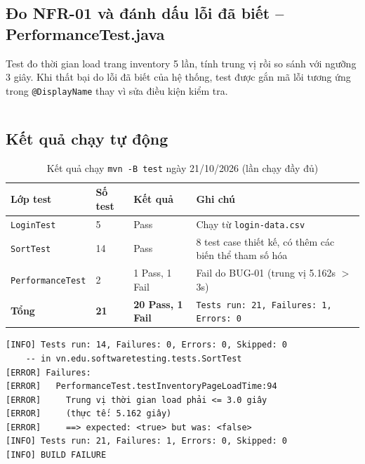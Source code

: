 \documentclass[12pt,a4paper]{article}
\newcommand{\tablestyle}{\small\renewcommand{\arraystretch}{1.25}}
\newcommand{\hrow}{\rowcolor{tablehead}}
\begin{document}
\subsection{Đo NFR-01 và đánh dấu lỗi đã biết -- PerformanceTest.java}
Test đo thời gian load trang inventory 5 lần, tính trung vị rồi so sánh với ngưỡng 3 giây.
Khi thất bại do lỗi đã biết của hệ thống, test được gắn mã lỗi tương ứng trong
\texttt{@DisplayName} thay vì sửa điều kiện kiểm tra.

\medskip
{}
\label{lst:perftest}
\vspace{-2pt}
\inputminted[frame=lines, framesep=2mm, rulecolor=black!40, bgcolor=black!3, linenos, numbersep=6pt, breaklines=true, breakautoindent=true, fontsize=\scriptsize, tabsize=4]{java}{../automation/src/test/java/vn/edu/softwaretesting/tests/PerformanceTest.java}


\subsection{Kết quả chạy tự động}
\begin{table}[H]
\centering
\tablestyle
\caption{Kết quả chạy \texttt{mvn -B test} ngày 21/10/2026 (lần chạy đầy đủ)}
\label{tab:mvnrun}
\begin{tabularx}{\textwidth}{L{3.8cm}C{1.4cm}L{2.5cm}Y}
\toprule
\hrow \textbf{Lớp test} & \textbf{Số test} & \textbf{Kết quả} & \textbf{Ghi chú} \\
\midrule
\texttt{LoginTest} & 5 & Pass & Chạy từ \texttt{login-data.csv} \\
\texttt{SortTest} & 14 & Pass & 8 test case thiết kế, có thêm các biến thể tham số hóa \\
\texttt{PerformanceTest} & 2 & 1 Pass, 1 Fail & Fail do BUG-01 (trung vị 5.162s $>$ 3s) \\
\midrule
\textbf{Tổng} & \textbf{21} & \textbf{20 Pass, 1 Fail} & \texttt{Tests run: 21, Failures: 1, Errors: 0} \\
\bottomrule
\end{tabularx}
\end{table}

\begin{verbatim}
[INFO] Tests run: 14, Failures: 0, Errors: 0, Skipped: 0
    -- in vn.edu.softwaretesting.tests.SortTest
[ERROR] Failures:
[ERROR]   PerformanceTest.testInventoryPageLoadTime:94
[ERROR]     Trung vị thời gian load phải <= 3.0 giây
[ERROR]     (thực tế: 5.162 giây)
[ERROR]     ==> expected: <true> but was: <false>
[INFO] Tests run: 21, Failures: 1, Errors: 0, Skipped: 0
[INFO] BUILD FAILURE
\end{verbatim}
\end{document}
